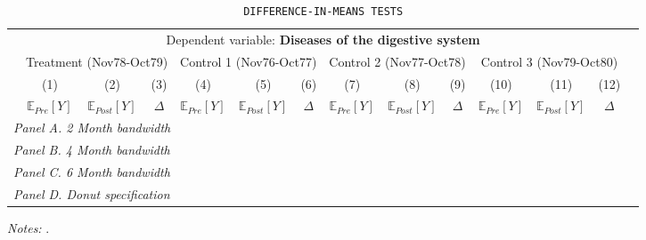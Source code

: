  \begin{table}[H] \begin{threeparttable} \centering \caption{\texttt{DIFFERENCE-IN-MEANS TESTS}} {\def\sym#1{\ifmmode^{#1}\else\(^{#1}\)\fi} \begin{tabular}{l*{13}{c}} \toprule & \multicolumn{12}{c}{Dependent variable: \textbf{Diseases of the digestive system}} \\ \cmidrule(lr){2-13}
            &\multicolumn{3}{c}{Treatment (Nov78-Oct79)}&\multicolumn{3}{c}{Control 1 (Nov76-Oct77)}&\multicolumn{3}{c}{Control 2 (Nov77-Oct78)}&\multicolumn{3}{c}{Control 3 (Nov79-Oct80)}\\\cmidrule(lr){2-4}\cmidrule(lr){5-7}\cmidrule(lr){8-10}\cmidrule(lr){11-13}
            &\multicolumn{1}{c}{(1)}&\multicolumn{1}{c}{(2)}&\multicolumn{1}{c}{(3)}&\multicolumn{1}{c}{(4)}&\multicolumn{1}{c}{(5)}&\multicolumn{1}{c}{(6)}&\multicolumn{1}{c}{(7)}&\multicolumn{1}{c}{(8)}&\multicolumn{1}{c}{(9)}&\multicolumn{1}{c}{(10)}&\multicolumn{1}{c}{(11)}&\multicolumn{1}{c}{(12)}\\
            &\multicolumn{1}{c}{$\mathbb{E}_{Pre}[Y]$}&\multicolumn{1}{c}{$\mathbb{E}_{Post}[Y]$}&\multicolumn{1}{c}{$\Delta$}&\multicolumn{1}{c}{$\mathbb{E}_{Pre}[Y]$}&\multicolumn{1}{c}{$\mathbb{E}_{Post}[Y]$}&\multicolumn{1}{c}{$\Delta$}&\multicolumn{1}{c}{$\mathbb{E}_{Pre}[Y]$}&\multicolumn{1}{c}{$\mathbb{E}_{Post}[Y]$}&\multicolumn{1}{c}{$\Delta$}&\multicolumn{1}{c}{$\mathbb{E}_{Pre}[Y]$}&\multicolumn{1}{c}{$\mathbb{E}_{Post}[Y]$}&\multicolumn{1}{c}{$\Delta$}\\
\midrule
 \multicolumn{13}{l}{\emph{Panel A. 2 Month bandwidth}} \\    \midrule\multicolumn{13}{l}{\emph{Panel B. 4 Month bandwidth}} \\    \midrule\multicolumn{13}{l}{\emph{Panel C. 6 Month bandwidth}} \\    \midrule\multicolumn{13}{l}{\emph{Panel D. Donut specification}} \\    
\bottomrule \end{tabular} } \begin{tablenotes} \item \scriptsize \emph{Notes:} . \end{tablenotes} \end{threeparttable} \end{table} 
